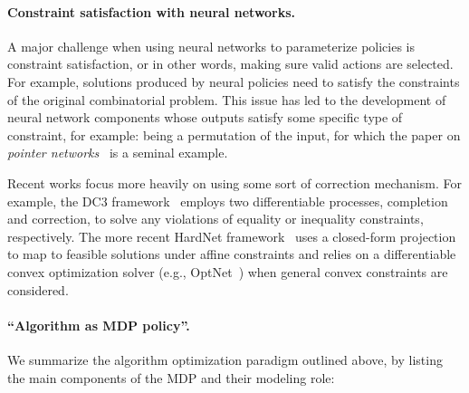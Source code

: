 \documentclass{report}
\theoremstyle{definition}
\theoremstyle{plain}
\begin{document}
\paragraph{Constraint satisfaction with neural networks.}

A major challenge when using neural networks to parameterize policies is
constraint satisfaction, or in other words, making sure valid actions are
selected. For example, solutions produced by neural policies need
to satisfy the constraints of the original combinatorial problem.
%
This issue has led to the development of neural network components whose outputs
satisfy some specific type of constraint, for example: being a permutation of
the input, for which the paper on \emph{pointer
  networks}~\cite{vinyalsPointerNetworks2017a} is a seminal example.

Recent works focus more heavily on using some sort of correction mechanism. For
example, the DC3 framework~\cite{dontiDC3LearningMethod2021} employs two
differentiable processes, completion and correction, to solve any violations of
equality or inequality constraints, respectively. The more recent HardNet
framework~\cite{minHardConstrainedNeuralNetworks2024} uses a closed-form
projection to map to feasible solutions under affine constraints and relies on a
differentiable convex optimization solver (e.g.,
OptNet~\cite{amosOptNetDifferentiableOptimization2021a}) when general convex
constraints are considered.

\pagebreak
\paragraph{``Algorithm as MDP policy''.}

We summarize the algorithm optimization paradigm outlined above, by listing the
main components of the MDP and their modeling role:
\end{document}
